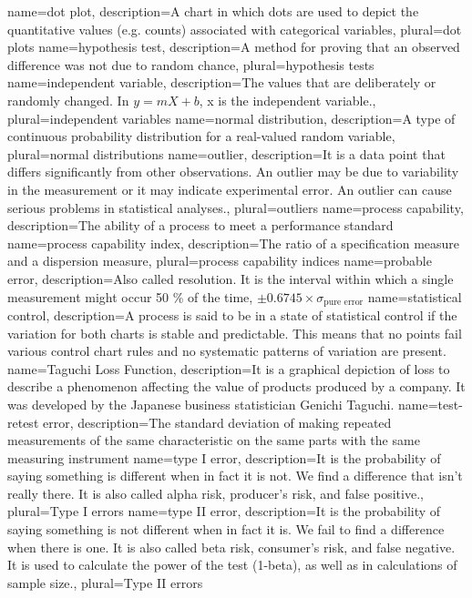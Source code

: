 {
    name={dot plot},
    description={A chart in which dots are used to depict the quantitative values (e.g. counts) associated with categorical variables},
    plural={dot plots}
}
{
    name={hypothesis test},
    description={A method for proving that an observed difference was not due to random chance},
    plural={hypothesis tests}
}
{
    name={independent variable},
    description={The values that are deliberately or randomly changed. In $y = mX + b$, x is the independent variable.},
    plural={independent variables}
}
{
    name={normal distribution},
    description={A type of continuous probability distribution for a real-valued random variable},
    plural={normal distributions}
}
{
    name={outlier},
    description={It is a data point that differs significantly from other observations. An outlier may be due to variability in the measurement or it may indicate experimental error. An outlier can cause serious problems in statistical analyses.},
    plural={outliers}
}
{
    name={process capability},
    description={The ability of a process to meet a performance standard}
}
{
    name={process capability index},
    description={The ratio of a specification measure and a dispersion measure},
    plural={process capability indices}
}
{
    name={probable error},
    description={Also called resolution. It is the interval within which a single measurement might occur 50 \% of the time, $\pm 0.6745 \times \sigma_\text{pure error}$}
}
{
    name={statistical control},
    description={A process is said to be in a state of statistical control if the variation for both charts is stable and predictable. This means that no points fail various control chart rules and no systematic patterns of variation are present.}
}
{
    name={Taguchi Loss Function},
    description={It is a graphical depiction of loss to describe a phenomenon affecting the value of products produced by a company. It was developed by the Japanese business statistician Genichi Taguchi.}
}
{
    name={test-retest error},
    description={The standard deviation of making repeated measurements of the same characteristic on the same parts with the same measuring instrument}
}
{
    name={type I error},
    description={It is the probability of saying something is different when in fact it is not. We find a difference that isn’t really there. It is also called alpha risk, producer's risk, and false positive.},
    plural={Type I errors}
}
{
    name={type II error},
    description={It is the probability of saying something is not different when in fact it is. We fail to find a difference when there is one. It is also called beta risk, consumer’s risk, and false negative. It is used to calculate the power of the test (1-beta), as well as in calculations of sample size.},
    plural={Type II errors}
}
